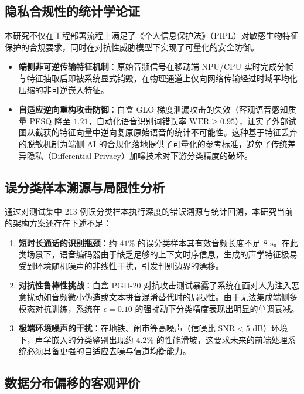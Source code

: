 \documentclass[11pt, a4paper]{article}
\begin{document}
\subsection{隐私合规性的统计学论证}

本研究不仅在工程部署流程上满足了《个人信息保护法》（PIPL）对敏感生物特征保护的合规要求，同时在对抗性威胁模型下实现了可量化的安全防御。

\begin{itemize}
    \item \textbf{端侧非可逆传输特征机制}：原始音频信号在移动端 NPU/CPU 实时完成分帧与特征抽取后即被系统显式销毁，在物理通道上仅向网络传输经过时域平均化压缩的非可逆嵌入特征。
    \item \textbf{自适应逆向重构攻击防御}：白盒 GLO 梯度泄漏攻击的失效（客观语音感知质量 PESQ 降至 $1.21$，自动化语音识别词错误率 $\mathrm{WER} \ge 0.95$），证实了外部试图从截获的特征向量中逆向复原原始语音的统计不可能性。这种基于特征丢弃的脱敏机制为端侧 AI 的合规化落地提供了可量化的参考标准，避免了传统差异隐私（Differential Privacy）加噪技术对下游分类精度的破坏。
\end{itemize}

\subsection{误分类样本溯源与局限性分析}

通过对测试集中 $213$ 例误分类样本执行深度的错误溯源与统计回溯，本研究当前的架构方案还存在下述不足：

\begin{enumerate}
    \item \textbf{短时长通话的识别瓶颈}：约 $41\%$ 的误分类样本其有效音频长度不足 $8\text{ s}$。在此类场景下，语音编码器由于缺乏足够的上下文时序信息，生成的声学特征极易受到环境随机噪声的非线性干扰，引发判别边界的漂移。
    \item \textbf{对抗性鲁棒性挑战}：白盒 $\mathrm{PGD}\text{-}20$ 对抗攻击测试暴露了系统在面对人为注入恶意扰动如音频微小伪造或文本拼音混淆替代时的局限性。由于无法集成端侧多模态对抗训练，系统在 $\epsilon = 0.10$ 的强扰动下分类精度表现出明显的单调衰减。
    \item \textbf{极端环境噪声的干扰}：在地铁、闹市等高噪声（信噪比 $\mathrm{SNR} < 5\text{ dB}$）环境下，声学嵌入的分类鉴别出现约 $4.2\%$ 的性能滑坡，这要求未来的前端处理系统必须具备更强的自适应去噪与信道均衡能力。
\end{enumerate}

\subsection{数据分布偏移的客观评价}
\end{document}
